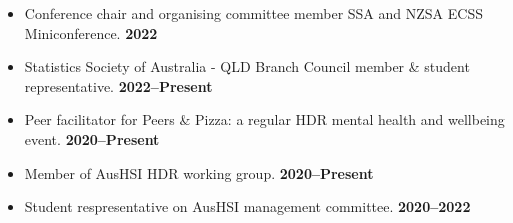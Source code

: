 \begin{itemize}
	\item Conference chair and organising committee member SSA and NZSA ECSS Miniconference. \hfill\textbf{2022}
	\item Statistics Society of Australia - QLD Branch Council member \& student representative. \hfill\textbf{2022--Present}
	\item Peer facilitator for Peers \& Pizza: a regular HDR mental health and wellbeing event. \hfill\textbf{2020--Present}
	\item Member of AusHSI HDR working group. \hfill\textbf{2020--Present}
	\item Student respresentative on AusHSI management committee. \hfill\textbf{2020--2022}
\end{itemize}\par